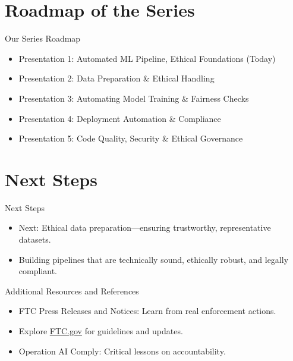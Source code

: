 \documentclass[aspectratio=169]{beamer}
\begin{document}
\section{Roadmap of the Series}

\begin{frame}{Our Series Roadmap}
\begin{itemize}
\item Presentation 1: Automated ML Pipeline, Ethical Foundations (Today)
\item Presentation 2: Data Preparation \& Ethical Handling
\item Presentation 3: Automating Model Training \& Fairness Checks
\item Presentation 4: Deployment Automation \& Compliance
\item Presentation 5: Code Quality, Security \& Ethical Governance
\end{itemize}
\end{frame}

\section{Next Steps}

\begin{frame}{Next Steps}
\begin{itemize}
\item Next: Ethical data preparation—ensuring trustworthy, representative datasets.
\item Building pipelines that are technically sound, ethically robust, and legally compliant.
\end{itemize}
\end{frame}

\begin{frame}{Additional Resources and References}
\begin{itemize}
\item FTC Press Releases and Notices: Learn from real enforcement actions.
\item Explore \href{https://www.ftc.gov/}{FTC.gov} for guidelines and updates.
\item Operation AI Comply: Critical lessons on accountability.
\end{itemize}
\end{frame}
\end{document}
